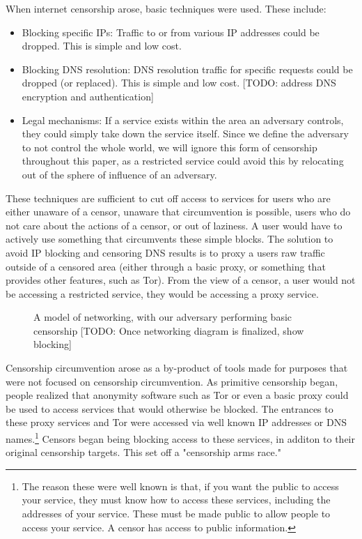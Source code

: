 \documentclass[12pt]{report}
\begin{document}
When internet censorship arose, basic techniques were used. These include:
\begin{itemize}
  \item Blocking specific IPs: Traffic to or from various IP addresses could be dropped. This is simple and low cost.
  \item Blocking DNS resolution: DNS resolution traffic for specific requests could be dropped (or replaced). This is simple and low cost. [TODO: address DNS encryption and authentication]
  \item Legal mechanisms: If a service exists within the area an adversary controls, they could simply take down the service itself. Since we define the adversary to not control the whole world, we will ignore this form of censorship throughout this paper, as a restricted service could avoid this by relocating out of the sphere of influence of an adversary.
\end{itemize}
These techniques are sufficient to cut off access to services for users who are either unaware of a censor, unaware that circumvention is possible, users who do not care about the actions of a censor, or out of laziness. A user would have to actively use something that circumvents these simple blocks. The solution to avoid IP blocking and censoring DNS results is to proxy a users raw traffic outside of a censored area (either through a basic proxy, or something that provides other features, such as Tor). From the view of a censor, a user would not be accessing a restricted service, they would be accessing a proxy service.

\begin{figure}
\begin{center}
{}
\end{center}
\caption{A model of networking, with our adversary performing basic censorship [TODO: Once networking diagram is finalized, show blocking]}
\end{figure}

Censorship circumvention arose as a by-product of tools made for purposes that were not focused on censorship circumvention. As primitive censorship began, people realized that anonymity software such as Tor or even a basic proxy could be used to access services that would otherwise be blocked. The entrances to these proxy services and Tor were accessed via well known IP addresses or DNS names.\footnote{The reason these were well known is that, if you want the public to access your service, they must know how to access these services, including the addresses of your service. These must be made public to allow people to access your service. A censor has access to public information.} Censors began being blocking access to these services, in additon to their original censorship targets. This set off a "censorship arms race."
\end{document}
